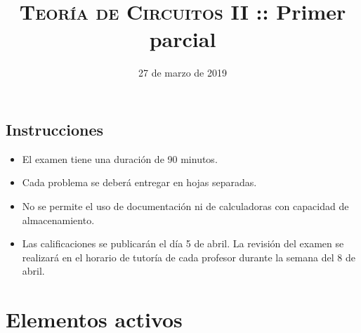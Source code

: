 \documentclass[12pt]{article}
\begin{document}
\title{\textsc{Teoría de Circuitos II} :: Primer parcial}

\date{27 de marzo de  2019}

\maketitle

\subsection*{Instrucciones}
\begin{itemize}
\item El examen tiene una duración de 90 minutos.
\item Cada problema se deberá entregar en hojas separadas.
\item No se permite el uso de documentación ni de calculadoras con capacidad de almacenamiento.
\item Las calificaciones se publicarán el día 5 de abril. La
  revisión del examen se realizará en el horario de tutoría de cada
  profesor durante la semana del 8 de abril.

\end{itemize}

\clearpage

\section{Elementos activos}
\end{document}
